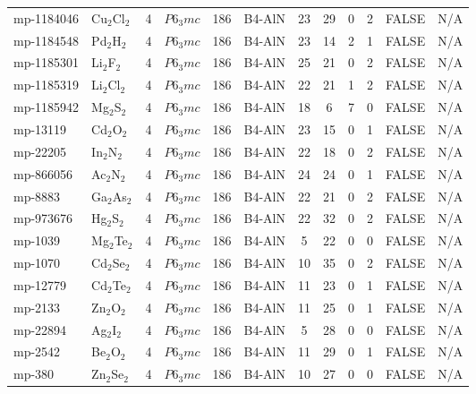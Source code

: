 {\begin{longtable}{llcccccccccc}
    mp-1184046 & Cu$_{2}$Cl$_{2}$ & 4     & $P6_3mc$ & 186   & B4-AlN & 23    & 29    & 0     & 2     & FALSE & N/A \\
    mp-1184548 & Pd$_{2}$H$_{2}$ & 4     & $P6_3mc$ & 186   & B4-AlN & 23    & 14    & 2     & 1     & FALSE & N/A \\
    mp-1185301 & Li$_{2}$F$_{2}$ & 4     & $P6_3mc$ & 186   & B4-AlN & 25    & 21    & 0     & 2     & FALSE & N/A \\
    mp-1185319 & Li$_{2}$Cl$_{2}$ & 4     & $P6_3mc$ & 186   & B4-AlN & 22    & 21    & 1     & 2     & FALSE & N/A \\
    mp-1185942 & Mg$_{2}$S$_{2}$ & 4     & $P6_3mc$ & 186   & B4-AlN & 18    & 6     & 7     & 0     & FALSE & N/A \\
    mp-13119 & Cd$_{2}$O$_{2}$ & 4     & $P6_3mc$ & 186   & B4-AlN & 23    & 15    & 0     & 1     & FALSE & N/A \\
    mp-22205 & In$_{2}$N$_{2}$ & 4     & $P6_3mc$ & 186   & B4-AlN & 22    & 18    & 0     & 2     & FALSE & N/A \\
    mp-866056 & Ac$_{2}$N$_{2}$ & 4     & $P6_3mc$ & 186   & B4-AlN & 24    & 24    & 0     & 1     & FALSE & N/A \\
    mp-8883 & Ga$_{2}$As$_{2}$ & 4     & $P6_3mc$ & 186   & B4-AlN & 22    & 21    & 0     & 2     & FALSE & N/A \\
    mp-973676 & Hg$_{2}$S$_{2}$ & 4     & $P6_3mc$ & 186   & B4-AlN & 22    & 32    & 0     & 2     & FALSE & N/A \\
    mp-1039 & Mg$_{2}$Te$_{2}$ & 4     & $P6_3mc$ & 186   & B4-AlN & 5     & 22    & 0     & 0     & FALSE & N/A \\
    mp-1070 & Cd$_{2}$Se$_{2}$ & 4     & $P6_3mc$ & 186   & B4-AlN & 10    & 35    & 0     & 2     & FALSE & N/A \\
    mp-12779 & Cd$_{2}$Te$_{2}$ & 4     & $P6_3mc$ & 186   & B4-AlN & 11    & 23    & 0     & 1     & FALSE & N/A \\
    mp-2133 & Zn$_{2}$O$_{2}$ & 4     & $P6_3mc$ & 186   & B4-AlN & 11    & 25    & 0     & 1     & FALSE & N/A \\
    mp-22894 & Ag$_{2}$I$_{2}$ & 4     & $P6_3mc$ & 186   & B4-AlN & 5     & 28    & 0     & 0     & FALSE & N/A \\
    mp-2542 & Be$_{2}$O$_{2}$ & 4     & $P6_3mc$ & 186   & B4-AlN & 11    & 29    & 0     & 1     & FALSE & N/A \\
    mp-380 & Zn$_{2}$Se$_{2}$ & 4     & $P6_3mc$ & 186   & B4-AlN & 10    & 27    & 0     & 0     & FALSE & N/A \\

\end{longtable}}
